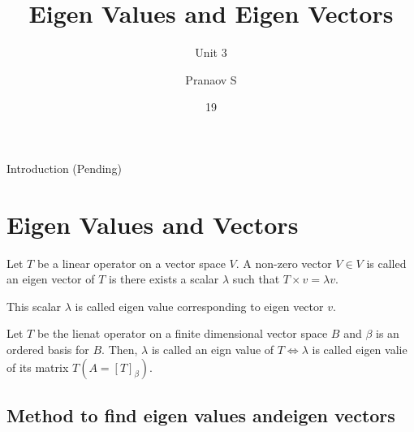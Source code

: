\documentclass[english,course,fleqn]{lecture}
\title{Eigen Values and Eigen Vectors}
\subtitle{Unit 3}
\author{Pranaov S}
\date{19}{10}{2024}
\begin{document}
\newpage

Introduction (Pending)


\section{Eigen Values and Vectors}

\begin{definition}
  Let $T$ be a linear operator on a vector space $V$.
  A non-zero vector $V \in V$ is called an eigen vector of $T$ is there exists a scalar $\lambda$ such that $T \times v = \lambda v$.

  This scalar $\lambda$ is called eigen value corresponding to eigen vector $v$.
\end{definition}

\begin{theorem}[]
  Let $T$ be the lienat operator on a finite dimensional vector space $B$ and $\beta$ is an ordered basis for $B$.
  Then, $\lambda$ is called an eign value of $T \iff \lambda$ is called eigen valie of its matrix $T (A = [T]_{\beta})$.
\end{theorem}

\subsection{Method to find eigen values andeigen vectors}
\end{document}
